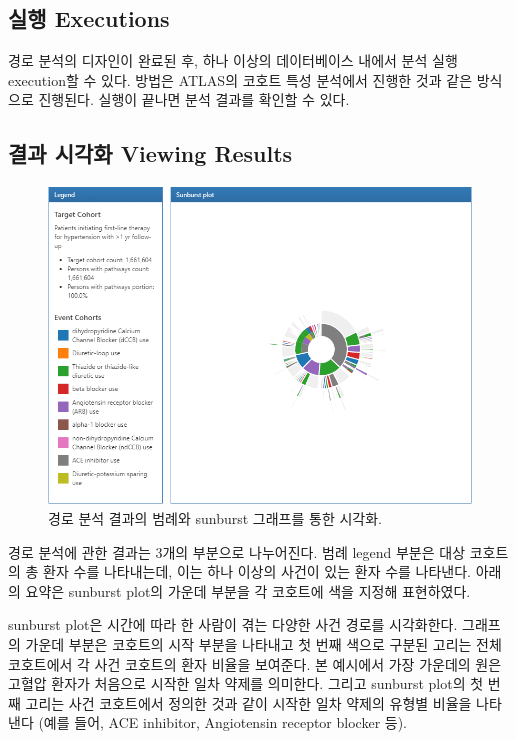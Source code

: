 \documentclass[10.5pt]{book}
\theoremstyle{definition}
\theoremstyle{definition}
\theoremstyle{definition}
\theoremstyle{remark}
\begin{document}
\subsection{실행 Executions}\label{-executions}

경로 분석의 디자인이 완료된 후, 하나 이상의 데이터베이스 내에서 분석
실행execution할 수 있다. 방법은 ATLAS의 코호트 특성 분석에서 진행한 것과
같은 방식으로 진행된다. 실행이 끝나면 분석 결과를 확인할 수 있다.

\subsection{결과 시각화 Viewing Results}\label{--viewing-results}

\begin{figure}

{\centering \includegraphics[width=1\linewidth]{images/Characterization/atlasPathwaysResults} 

}

\caption{경로 분석 결과의 범례와 sunburst 그래프를 통한 시각화.}\label{fig:atlasPathwaysResults}
\end{figure}

경로 분석에 관한 결과는 3개의 부분으로 나누어진다. 범례 legend 부분은
대상 코호트의 총 환자 수를 나타내는데, 이는 하나 이상의 사건이 있는 환자
수를 나타낸다. 아래의 요약은 sunburst plot의 가운데 부분을 각 코호트에
색을 지정해 표현하였다.

sunburst plot은 시간에 따라 한 사람이 겪는 다양한 사건 경로를
시각화한다. 그래프의 가운데 부분은 코호트의 시작 부분을 나타내고 첫 번째
색으로 구분된 고리는 전체 코호트에서 각 사건 코호트의 환자 비율을
보여준다. 본 예시에서 가장 가운데의 원은 고혈압 환자가 처음으로 시작한
일차 약제를 의미한다. 그리고 sunburst plot의 첫 번째 고리는 사건
코호트에서 정의한 것과 같이 시작한 일차 약제의 유형별 비율을 나타낸다
(예를 들어, ACE inhibitor, Angiotensin receptor blocker 등).
\end{document}
